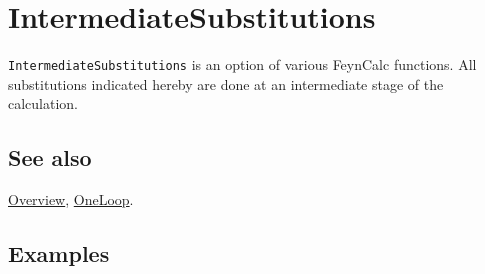 \documentclass[../FeynCalcManual.tex]{subfiles}
\begin{document}
\hypertarget{intermediatesubstitutions}{%
\section{IntermediateSubstitutions}\label{intermediatesubstitutions}}

\texttt{IntermediateSubstitutions} is an option of various FeynCalc
functions. All substitutions indicated hereby are done at an
intermediate stage of the calculation.

\subsection{See also}

\hyperlink{toc}{Overview}, \hyperlink{oneloop}{OneLoop}.

\subsection{Examples}
\end{document}
